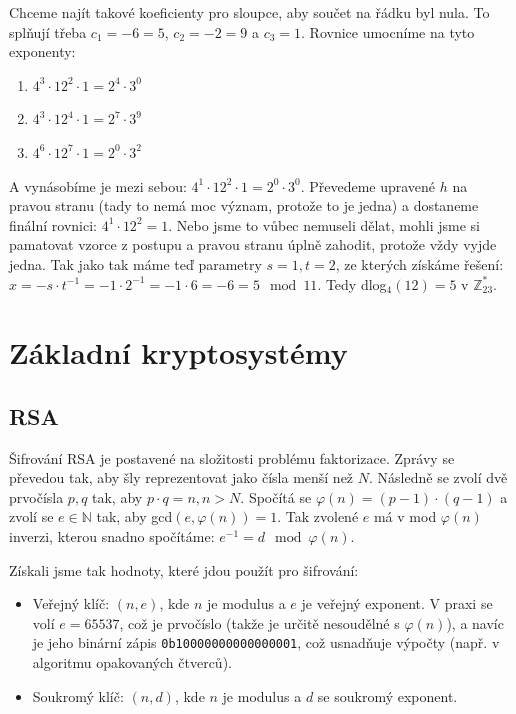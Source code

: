 \begin{exercise}
\begin{enumerate}
Chceme najít takové koeficienty pro sloupce, aby součet na řádku byl nula. To
splňují třeba $c_1 = -6 = 5$, $c_2 = -2 = 9$ a $c_3 = 1$.  Rovnice umocníme na
tyto exponenty:

\begin{enumerate}
\item $4^3\cdot 12^2 \cdot 1 = 2^4\cdot 3^0$
\item $4^3\cdot 12^4 \cdot 1 = 2^7\cdot 3^9$
\item $4^6\cdot 12^7 \cdot 1 = 2^0\cdot 3^2$
\end{enumerate}

A vynásobíme je mezi sebou: $4^1\cdot 12^2 \cdot 1 = 2^0\cdot 3^0$. Převedeme
upravené $h$ na pravou stranu (tady to nemá moc význam, protože to je jedna) a
dostaneme finální rovnici: $4^1\cdot 12^2  = 1$. Nebo jsme to vůbec nemuseli
dělat, mohli jsme si pamatovat vzorce z postupu a pravou stranu úplně zahodit,
protože vždy vyjde jedna. Tak jako tak máme teď parametry $s=1, t=2$, ze kterých
získáme řešení: $x = -s\cdot t^{-1} = -1 \cdot 2^{-1} = -1 \cdot 6 = -6 = 5 \mod
11$. Tedy dlog$_4(12) = 5$ v $\mathbb{Z}_{23}^*$.
\end{enumerate}
\end{exercise}

\section{Základní kryptosystémy}
\subsection{RSA}
Šifrování RSA je postavené na složitosti problému faktorizace. Zprávy se
převedou tak, aby šly reprezentovat jako čísla menší než $N$. Následně se zvolí
dvě prvočísla $p, q$ tak, aby $p \cdot q = n, n > N$. Spočítá se $\varphi(n) =
(p-1)\cdot (q-1)$ a zvolí se $e \in \mathbb{N}$ tak, aby gcd$(e, \varphi(n)) =
1$. Tak zvolené $e$ má v mod $\varphi(n)$ inverzi, kterou snadno spočítáme:
$e^{-1} = d \mod \varphi(n)$.

Získali jsme tak hodnoty, které jdou použít pro šifrování:
\begin{itemize}
    \item Veřejný klíč: $(n, e)$, kde $n$ je modulus a $e$ je veřejný exponent.
    V praxi se volí $e = 65537$, což je prvočíslo (takže je určitě nesoudělné s
    $\varphi(n)$), a navíc je jeho binární zápis \texttt{0b10000000000000001},
    což usnadňuje výpočty (např. v algoritmu opakovaných čtverců).
    \item Soukromý klíč: $(n, d)$, kde $n$ je modulus a $d$ se soukromý
    exponent.
\end{itemize}

